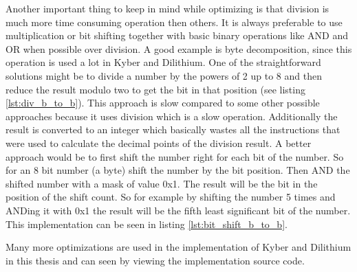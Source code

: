 Another important thing to keep in mind while optimizing is that division is much more time consuming operation then others. It is always preferable to use multiplication or bit shifting together with basic binary operations like AND and OR when possible over division. A good example is byte decomposition, since this operation is used a lot in Kyber and Dilithium. One of the straightforward solutions might be to divide a number by the powers of 2 up to 8 and then reduce the result modulo two to get the bit in that position (see listing \ref{lst:div_b_to_b}).
\noindent This approach is slow compared to some other possible approaches because it uses division which is a slow operation. Additionally the result is converted to an integer which basically wastes all the instructions that were used to calculate the decimal points of the division result. A better approach would be to first shift the number right for each bit of the number. So for an 8 bit number (a byte) shift the number by the bit position. Then AND the shifted number with a mask of value 0x1. The result will be the bit in the position of the shift count. So for example by shifting the number 5 times and ANDing it with 0x1 the result will be the fifth least significant bit of the number. This implementation can be seen in listing \ref{lst:bit_shift_b_to_b}.

Many more optimizations are used in the implementation of Kyber and Dilithium in this thesis and can seen by viewing the implementation source code.

